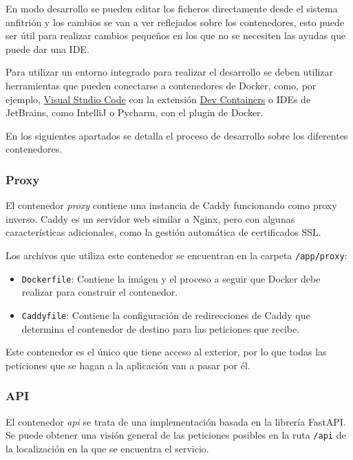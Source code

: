 En modo desarrollo se pueden editar los ficheros directamente desde el sistema
anfitrión y los cambios se van a ver reflejados sobre los contenedores, esto
puede ser útil para realizar cambios pequeños en los que no se necesiten las
ayudas que puede dar una IDE.

Para utilizar un entorno integrado para realizar el desarrollo se deben utilizar
herramientas que pueden conectarse a contenedores de Docker, como, por ejemplo,
\href{https://code.visualstudio.com/}{Visual Studio Code} con la extensión
\href{https://marketplace.visualstudio.com/items?itemName=ms-vscode-remote.remote-containers}{Dev
Containers} o IDEs de JetBrains, como IntelliJ o Pycharm, con el plugin de
Docker.

En los siguientes apartados se detalla el proceso de desarrollo sobre los
diferentes contenedores.

\subsubsection{Proxy}

El contenedor \textit{proxy} contiene una instancia de Caddy funcionando como
proxy inverso. Caddy es un servidor web similar a Nginx, pero con algunas
características adicionales, como la gestión automática de certificados SSL.

Los archivos que utiliza este contenedor se encuentran en la carpeta
\texttt{/app/proxy}:

\begin{itemize}
    \item \texttt{Dockerfile}: Contiene la imágen y el proceso a seguir que
          Docker debe realizar para construir el contenedor.
    \item \texttt{Caddyfile}: Contiene la configuración de redirecciones de
          Caddy que determina el contenedor de destino para las peticiones que
          recibe.
\end{itemize}

Este contenedor es el único que tiene acceso al exterior, por lo que todas las
peticiones que se hagan a la aplicación van a pasar por él.

\subsubsection{API}

El contenedor \textit{api} se trata de una implementación basada en la librería
FastAPI. Se puede obtener una visión general de las peticiones posibles en la
ruta \texttt{/api} de la localización en la que se encuentra el servicio.

